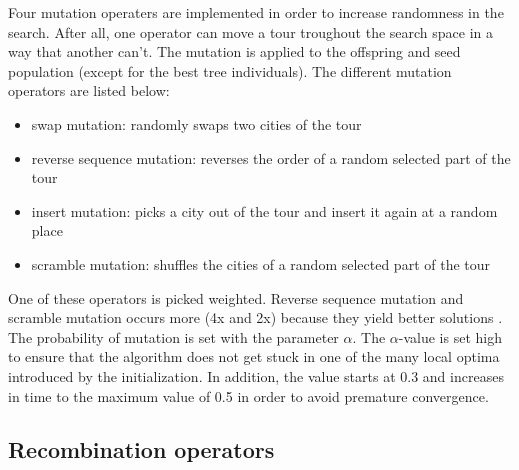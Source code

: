 \documentclass[a4paper,10pt]{article}
\newcommand{\ReplaceMe}[1]{{\color{blue}#1}}
\begin{document}
Four mutation operaters are implemented in order to increase randomness in the search. After all, one operator can move a tour troughout the search space in a way that another can't. The mutation is applied to the offspring and seed population (except for the best tree individuals). The different mutation operators are listed below:
\begin{itemize}
  \item swap mutation: randomly swaps two cities of the tour
  \item reverse sequence mutation: reverses the order of a random selected part of the tour
  \item insert mutation: picks a city out of the tour and insert it again at a random place
  \item scramble mutation: shuffles the cities of a random selected part of the tour
\end{itemize}
One of these operators is picked weighted. Reverse sequence mutation and scramble mutation occurs more (4x and 2x) because they yield better solutions \cite{mutationperformance}.
The probability of mutation is set with the parameter $\alpha$. The $\alpha$-value is set high to ensure that the algorithm does not get stuck in one of the many local optima introduced by the initialization. In addition, the value starts at 0.3 and increases in time to the maximum value of 0.5 in order to avoid premature convergence. 

\subsection{Recombination operators}\label{ssec:recombination}

\end{document}
